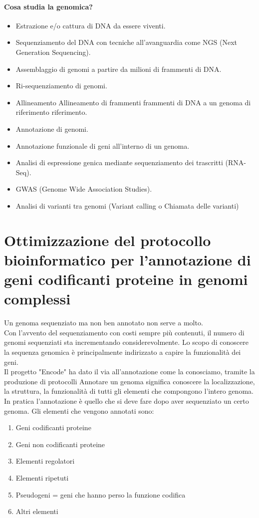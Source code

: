 \documentclass{article}
\begin{document}
\paragraph{Cosa studia la genomica?}
\begin{itemize}
    \item Estrazione e/o cattura di DNA da essere viventi.
    \item Sequenziamento del DNA con tecniche all'avanguardia come NGS
    (Next Generation Sequencing).
    \item Assemblaggio di genomi a partire da milioni di frammenti di DNA.
    \item Ri-sequenziamento di genomi.
    \item Allineamento Allineamento di frammenti frammenti di DNA a un genoma di riferimento riferimento. \item Annotazione di genomi. \item Annotazione funzionale di geni all'interno di un genoma.
    \item Analisi di espressione genica mediante sequenziamento dei
    trascritti (RNA-Seq).
    \item GWAS (Genome Wide Association Studies).
    \item Analisi di varianti tra genomi (Variant calling o Chiamata delle
    varianti)
\end{itemize}

\section{Ottimizzazione del protocollo bioinformatico per l'annotazione di geni codificanti proteine in genomi complessi}
Un genoma sequenziato ma non ben annotato non serve a molto.\\
Con l'avvento del sequenziamento con costi sempre più contenuti, il numero di genomi sequenziati sta incrementando considerevolmente. Lo scopo di conoscere la sequenza genomica è principalmente indirizzato a capire la funzionalità dei geni.\\
Il progetto "Encode" ha dato il via all'annotazione come la conosciamo, tramite la produzione di protocolli
Annotare un genoma significa conoscere la localizzazione, la struttura, la funzionalità di tutti gli elementi che compongono l'intero genoma. In pratica l'annotazione è quello che si deve fare dopo aver sequenziato un certo genoma. Gli elementi che vengono annotati sono:
\begin{enumerate}
    \item Geni codificanti proteine
    \item Geni non codificanti proteine
    \item Elementi regolatori
    \item Elementi ripetuti
    \item Pseudogeni = geni che hanno perso la funzione codifica
    \item Altri elementi
\end{enumerate}
\end{document}
